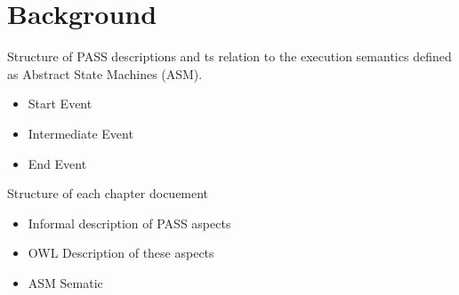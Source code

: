 \chapter{Background}
Structure of PASS descriptions and ts relation to the execution semantics defined as Abstract State Machines (ASM).

\begin{itemize}
	\item Start Event
	\item Intermediate Event
	\item End Event
\end{itemize}


Structure of each chapter docuement
\begin{itemize}
	\item Informal description of PASS aspects
	\item OWL Description of these aspects
	\item ASM Sematic
\end{itemize}

